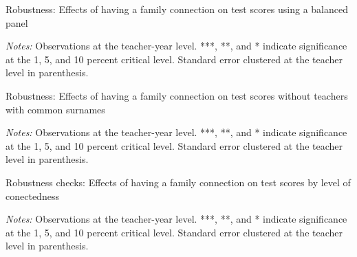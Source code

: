 \documentclass[12pt,runningheads]{article}
\begin{document}
\begin{table}[H]
\centering
\renewcommand*{\arraystretch}{1.2}
\begin{threeparttable}
\caption{Robustness: Effects of having a family connection on test scores using a balanced panel}
\label{table:results_sample}

\begin{tablenotes}
\footnotesize
\item \textit{Notes:} Observations at the teacher-year level. ***, **, and * indicate significance at the 1, 5, and 10 percent critical level. Standard error clustered at the teacher level in parenthesis. 
\end{tablenotes}
\end{threeparttable}
\end{table}



\newpage
\begin{table}[H]
\centering
\renewcommand*{\arraystretch}{1.2}
\begin{threeparttable}
\caption{Robustness: Effects of having a family connection on test scores without teachers with common surnames}
\label{table:robust1}

\begin{tablenotes}
\footnotesize
\item \textit{Notes:} Observations at the teacher-year level. ***, **, and * indicate significance at the 1, 5, and 10 percent critical level. Standard error clustered at the teacher level in parenthesis. 
\end{tablenotes}
\end{threeparttable}
\end{table}

\newpage
\begin{table}[H]
\centering
\renewcommand*{\arraystretch}{1.2}
\begin{threeparttable}
\caption{Robustness checks: Effects of having a family connection on test scores by level of conectedness}
\label{table:robust2}

\begin{tablenotes}
\footnotesize
\item \textit{Notes:} Observations at the teacher-year level. ***, **, and * indicate significance at the 1, 5, and 10 percent critical level. Standard error clustered at the teacher level in parenthesis. 
\end{tablenotes}
\end{threeparttable}
\end{table}
\end{document}
